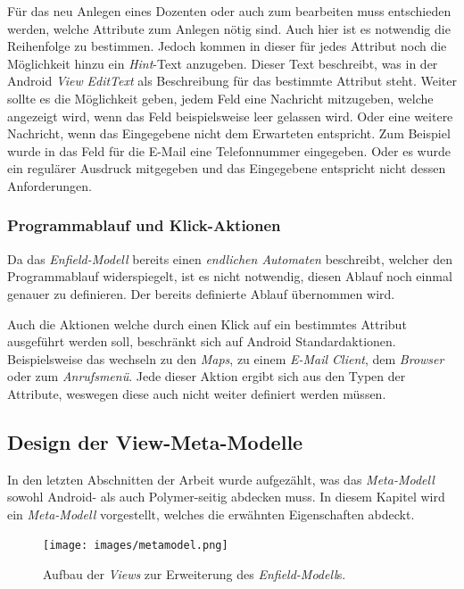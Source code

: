 Für das neu Anlegen eines Dozenten oder auch zum bearbeiten muss entschieden werden, welche Attribute zum Anlegen nötig sind. Auch hier ist es notwendig die Reihenfolge zu bestimmen. Jedoch kommen in dieser \textit{} für jedes Attribut noch die Möglichkeit hinzu ein \textit{Hint}-Text anzugeben. Dieser Text beschreibt, was in der Android \textit{View} \textit{EditText} als Beschreibung für das bestimmte Attribut steht. Weiter sollte es die Möglichkeit geben, jedem Feld eine Nachricht mitzugeben, welche angezeigt wird, wenn das Feld beispielsweise leer gelassen wird. Oder eine weitere Nachricht, wenn das Eingegebene nicht dem Erwarteten entspricht. Zum Beispiel wurde in das Feld für die E-Mail eine Telefonnummer eingegeben. Oder es wurde ein regulärer Ausdruck mitgegeben und das Eingegebene entspricht nicht dessen Anforderungen.

\subsubsection{Programmablauf und Klick-Aktionen}

Da das \textit{Enfield-Modell} bereits einen \textit{endlichen Automaten} beschreibt, welcher den Programmablauf widerspiegelt, ist es nicht notwendig, diesen Ablauf noch einmal genauer zu definieren. Der bereits definierte Ablauf übernommen wird.

Auch die Aktionen welche durch einen Klick auf ein bestimmtes Attribut ausgeführt werden soll, beschränkt sich auf Android Standardaktionen. Beispielsweise das wechseln zu den \textit{Maps}, zu einem \textit{E-Mail Client}, dem \textit{Browser} oder zum \textit{Anrufsmenü}. Jede dieser Aktion ergibt sich aus den Typen der Attribute, weswegen diese auch nicht weiter definiert werden müssen.

\subsection{Design der View-Meta-Modelle} \label{sec:resourceViews}

In den letzten Abschnitten der Arbeit wurde aufgezählt, was das \textit{Meta-Modell} sowohl Android- als auch Polymer-seitig abdecken muss. In diesem Kapitel wird ein \textit{Meta-Modell} vorgestellt, welches die erwähnten Eigenschaften abdeckt.


\begin{figure}[H]
	\begin{center}
		\texttt{[image: images/metamodel.png]}
		\caption{Aufbau der \textit{Views} zur Erweiterung des \textit{Enfield-Modell}s.}
		\label{fig:meta-model}
	\end{center}
\end{figure}

